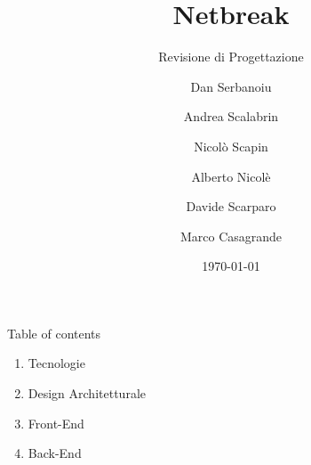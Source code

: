 \documentclass[10pt]{beamer}
\title{Netbreak}
\subtitle{Revisione di Progettazione}
\author{
	Dan Serbanoiu\\      
	\and
	Andrea Scalabrin\\  
	\and
	Nicol\`{o} Scapin\\  
	\and
	Alberto Nicol\`{e}\\  
	\and
	Davide Scarparo\\  
	\and
	Marco Casagrande\\   
}
\date{\today}
\institute{Universit\`{a} di Padova}
\begin{document}
\maketitle

\begin{frame}{Table of contents}
	\begin{enumerate}
		\item Tecnologie
		\item Design Architetturale
		\item Front-End
		\item Back-End
	\end{enumerate}
\end{frame}







\end{document}
